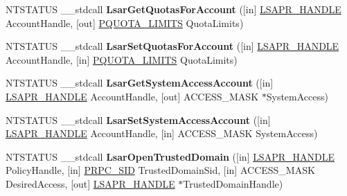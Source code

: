\begin{DoxyCompactItemize}
\item 
\mbox{\label{interfacelsarpc_a43c1683602501b8e9967605c01d92ea5}} 
N\+T\+S\+T\+A\+T\+US \+\_\+\+\_\+stdcall {\bfseries Lsar\+Get\+Quotas\+For\+Account} (\mbox{[}in\mbox{]} \hyperlink{interfacevoid}{L\+S\+A\+P\+R\+\_\+\+H\+A\+N\+D\+LE} Account\+Handle, \mbox{[}out\mbox{]} \hyperlink{struct___q_u_o_t_a___l_i_m_i_t_s}{P\+Q\+U\+O\+T\+A\+\_\+\+L\+I\+M\+I\+TS} Quota\+Limits)
\item 
\mbox{\label{interfacelsarpc_a0ac2e5d47348a4e85c64a7248cfcb094}} 
N\+T\+S\+T\+A\+T\+US \+\_\+\+\_\+stdcall {\bfseries Lsar\+Set\+Quotas\+For\+Account} (\mbox{[}in\mbox{]} \hyperlink{interfacevoid}{L\+S\+A\+P\+R\+\_\+\+H\+A\+N\+D\+LE} Account\+Handle, \mbox{[}in\mbox{]} \hyperlink{struct___q_u_o_t_a___l_i_m_i_t_s}{P\+Q\+U\+O\+T\+A\+\_\+\+L\+I\+M\+I\+TS} Quota\+Limits)
\item 
\mbox{\label{interfacelsarpc_a90adb9578423d74ae88a0036383c1ca6}} 
N\+T\+S\+T\+A\+T\+US \+\_\+\+\_\+stdcall {\bfseries Lsar\+Get\+System\+Access\+Account} (\mbox{[}in\mbox{]} \hyperlink{interfacevoid}{L\+S\+A\+P\+R\+\_\+\+H\+A\+N\+D\+LE} Account\+Handle, \mbox{[}out\mbox{]} A\+C\+C\+E\+S\+S\+\_\+\+M\+A\+SK $\ast$System\+Access)
\item 
\mbox{\label{interfacelsarpc_aacafbcd046f5860c8f75ded6f514c6dd}} 
N\+T\+S\+T\+A\+T\+US \+\_\+\+\_\+stdcall {\bfseries Lsar\+Set\+System\+Access\+Account} (\mbox{[}in\mbox{]} \hyperlink{interfacevoid}{L\+S\+A\+P\+R\+\_\+\+H\+A\+N\+D\+LE} Account\+Handle, \mbox{[}in\mbox{]} A\+C\+C\+E\+S\+S\+\_\+\+M\+A\+SK System\+Access)
\item 
\mbox{\label{interfacelsarpc_a2382ab96cded476d1e51f1704dac869d}} 
N\+T\+S\+T\+A\+T\+US \+\_\+\+\_\+stdcall {\bfseries Lsar\+Open\+Trusted\+Domain} (\mbox{[}in\mbox{]} \hyperlink{interfacevoid}{L\+S\+A\+P\+R\+\_\+\+H\+A\+N\+D\+LE} Policy\+Handle, \mbox{[}in\mbox{]} \hyperlink{struct___r_p_c___s_i_d}{P\+R\+P\+C\+\_\+\+S\+ID} Trusted\+Domain\+Sid, \mbox{[}in\mbox{]} A\+C\+C\+E\+S\+S\+\_\+\+M\+A\+SK Desired\+Access, \mbox{[}out\mbox{]} \hyperlink{interfacevoid}{L\+S\+A\+P\+R\+\_\+\+H\+A\+N\+D\+LE} $\ast$Trusted\+Domain\+Handle)
\item 
\mbox{\label{interfacelsarpc_a667849857184bdff62666f1f57fb21bc}} 

\end{DoxyCompactItemize}
